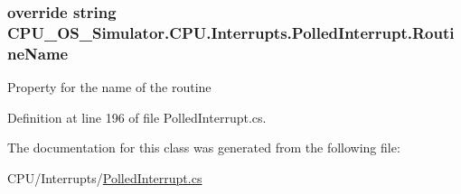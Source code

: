 \subsubsection[{Routine\+Name}]{\setlength{\rightskip}{0pt plus 5cm}override string C\+P\+U\+\_\+\+O\+S\+\_\+\+Simulator.\+C\+P\+U.\+Interrupts.\+Polled\+Interrupt.\+Routine\+Name\hspace{0.3cm}{\ttfamily [get]}}\label{class_c_p_u___o_s___simulator_1_1_c_p_u_1_1_interrupts_1_1_polled_interrupt_a62e236aa64f6ade8cb01192768bb75ba}


Property for the name of the routine 



Definition at line 196 of file Polled\+Interrupt.\+cs.



The documentation for this class was generated from the following file\+:\begin{DoxyCompactItemize}
\item 
C\+P\+U/\+Interrupts/\hyperlink{_polled_interrupt_8cs}{Polled\+Interrupt.\+cs}\end{DoxyCompactItemize}
